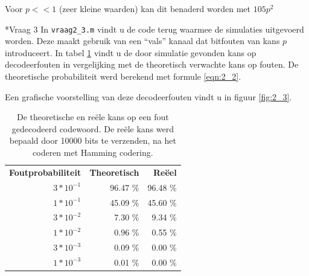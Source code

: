 \documentclass[]{article}
\begin{document}
\begin{section}
\begin{subsection}
        Voor $p << 1$ (zeer kleine waarden) kan dit benaderd worden
        met $105p^2$

    \end{subsection}

    \begin{subsection}*{Vraag 3} %
        In \texttt{vraag2\_3.m} vindt u de code terug waarmee de
        simulaties uitgevoerd worden. Deze maakt gebruik van een
        ``vals'' kanaal dat bitfouten van kans $p$ introduceert. In
        tabel \ref{tab:2_3} vindt u de door simulatie gevonden
        kans op decodeerfouten in vergelijking met de theoretisch verwachte
        kans op fouten. De theoretische probabiliteit werd
        berekend met formule \ref{eqn:2_2}.

        Een grafische voorstelling van deze decodeerfouten vindt u in
        figuur \ref{fig:2_3}.

        \begin{table}[h]
            \centering
            \begin{tabular}{rrr}
                \textbf{Foutprobabiliteit} &
                \textbf{Theoretisch} &
                \textbf{Re\"eel} \\
                $3 * 10^{-1}$ & 96.47 \% & 96.48 \% \\
                $1 * 10^{-1}$ & 45.09 \% & 45.60 \% \\
                $3 * 10^{-2}$ &  7.30 \% &  9.34 \% \\
                $1 * 10^{-2}$ &  0.96 \% &  0.55 \% \\
                $3 * 10^{-3}$ &  0.09 \% &  0.00 \% \\
                $1 * 10^{-3}$ &  0.01 \% &  0.00 \%
            \end{tabular}
            \caption{De theoretische en re\"ele kans op een fout
                gedecodeerd codewoord. De re\"ele kans werd bepaald
                door 10000 bits te verzenden, na het coderen met
            Hamming codering.}
            \label{tab:2_3}
        \end{table}


\end{subsection}
\end{section}
\end{document}
